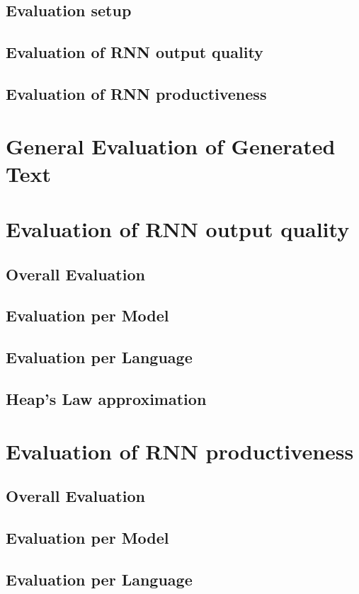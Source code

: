 \documentclass[11pt,a4paper,twoside,openright]{scrbook}
\begin{document}
\section{Evaluation setup}
\section{Evaluation of RNN output quality}
\section{Evaluation of RNN productiveness}

\chapter{General Evaluation of Generated Text}

\chapter{Evaluation of RNN output quality}
\section{Overall Evaluation}
\section{Evaluation per Model}
\section{Evaluation per Language}
\section{Heap's Law approximation}

\chapter{Evaluation of RNN productiveness}
\section{Overall Evaluation}
\section{Evaluation per Model}
\section{Evaluation per Language}
\end{document}
